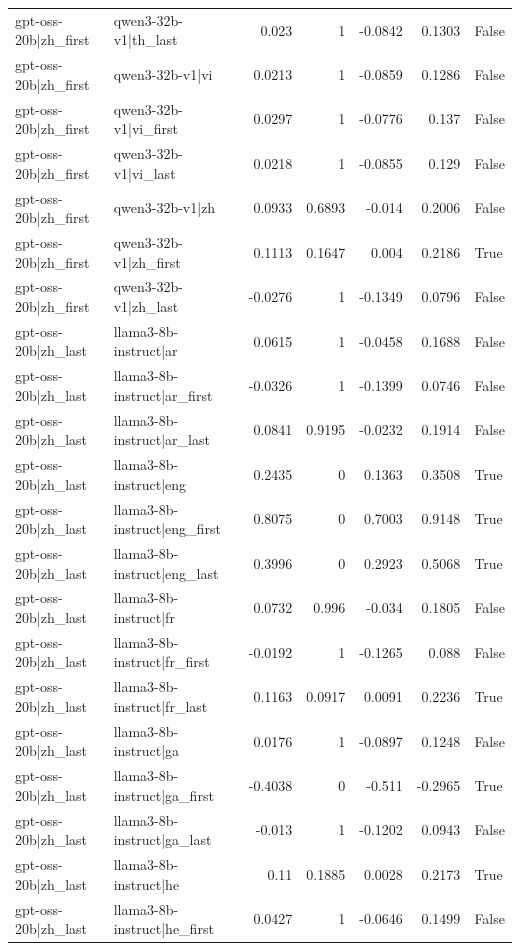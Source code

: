 \begin{table}
\begin{tabular}{l l r r r r l}
gpt-oss-20b|zh_first & qwen3-32b-v1|th_last & 0.023 & 1 & -0.0842 & 0.1303 & False \\
gpt-oss-20b|zh_first & qwen3-32b-v1|vi & 0.0213 & 1 & -0.0859 & 0.1286 & False \\
gpt-oss-20b|zh_first & qwen3-32b-v1|vi_first & 0.0297 & 1 & -0.0776 & 0.137 & False \\
gpt-oss-20b|zh_first & qwen3-32b-v1|vi_last & 0.0218 & 1 & -0.0855 & 0.129 & False \\
gpt-oss-20b|zh_first & qwen3-32b-v1|zh & 0.0933 & 0.6893 & -0.014 & 0.2006 & False \\
gpt-oss-20b|zh_first & qwen3-32b-v1|zh_first & 0.1113 & 0.1647 & 0.004 & 0.2186 & True \\
gpt-oss-20b|zh_first & qwen3-32b-v1|zh_last & -0.0276 & 1 & -0.1349 & 0.0796 & False \\
gpt-oss-20b|zh_last & llama3-8b-instruct|ar & 0.0615 & 1 & -0.0458 & 0.1688 & False \\
gpt-oss-20b|zh_last & llama3-8b-instruct|ar_first & -0.0326 & 1 & -0.1399 & 0.0746 & False \\
gpt-oss-20b|zh_last & llama3-8b-instruct|ar_last & 0.0841 & 0.9195 & -0.0232 & 0.1914 & False \\
gpt-oss-20b|zh_last & llama3-8b-instruct|eng & 0.2435 & 0 & 0.1363 & 0.3508 & True \\
gpt-oss-20b|zh_last & llama3-8b-instruct|eng_first & 0.8075 & 0 & 0.7003 & 0.9148 & True \\
gpt-oss-20b|zh_last & llama3-8b-instruct|eng_last & 0.3996 & 0 & 0.2923 & 0.5068 & True \\
gpt-oss-20b|zh_last & llama3-8b-instruct|fr & 0.0732 & 0.996 & -0.034 & 0.1805 & False \\
gpt-oss-20b|zh_last & llama3-8b-instruct|fr_first & -0.0192 & 1 & -0.1265 & 0.088 & False \\
gpt-oss-20b|zh_last & llama3-8b-instruct|fr_last & 0.1163 & 0.0917 & 0.0091 & 0.2236 & True \\
gpt-oss-20b|zh_last & llama3-8b-instruct|ga & 0.0176 & 1 & -0.0897 & 0.1248 & False \\
gpt-oss-20b|zh_last & llama3-8b-instruct|ga_first & -0.4038 & 0 & -0.511 & -0.2965 & True \\
gpt-oss-20b|zh_last & llama3-8b-instruct|ga_last & -0.013 & 1 & -0.1202 & 0.0943 & False \\
gpt-oss-20b|zh_last & llama3-8b-instruct|he & 0.11 & 0.1885 & 0.0028 & 0.2173 & True \\
gpt-oss-20b|zh_last & llama3-8b-instruct|he_first & 0.0427 & 1 & -0.0646 & 0.1499 & False \\

\end{tabular}
\end{table}
